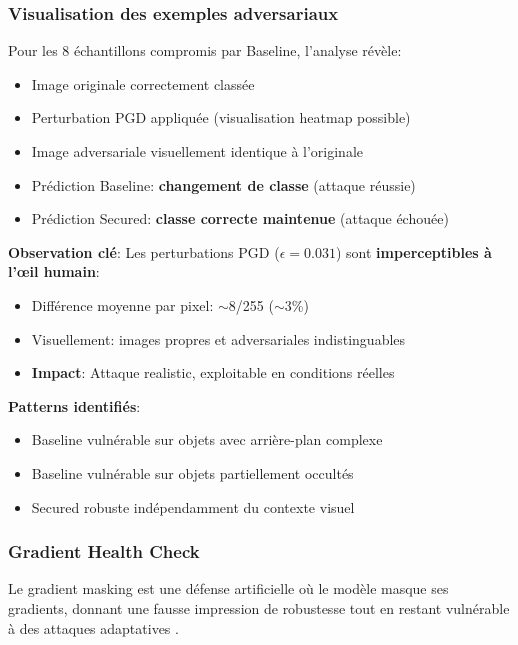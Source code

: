\subsubsection{Visualisation des exemples adversariaux}

Pour les 8 échantillons compromis par Baseline, l'analyse révèle:

\begin{itemize}
    \item Image originale correctement classée
    \item Perturbation PGD appliquée (visualisation heatmap possible)
    \item Image adversariale visuellement identique à l'originale
    \item Prédiction Baseline: \textbf{changement de classe} (attaque réussie)
    \item Prédiction Secured: \textbf{classe correcte maintenue} (attaque échouée)
\end{itemize}

\textbf{Observation clé}: Les perturbations PGD ($\epsilon=0.031$) sont \textbf{imperceptibles à l'œil humain}:

\begin{itemize}
    \item Différence moyenne par pixel: $\sim$8/255 ($\sim$3\%)
    \item Visuellement: images propres et adversariales indistinguables
    \item \textbf{Impact}: Attaque realistic, exploitable en conditions réelles
\end{itemize}

\textbf{Patterns identifiés}:

\begin{itemize}
    \item Baseline vulnérable sur objets avec arrière-plan complexe
    \item Baseline vulnérable sur objets partiellement occultés
    \item Secured robuste indépendamment du contexte visuel
\end{itemize}

\subsubsection{Gradient Health Check}

Le gradient masking est une défense artificielle où le modèle masque ses gradients, donnant une fausse impression de robustesse tout en restant vulnérable à des attaques adaptatives \cite{athalye2018obfuscated}.

